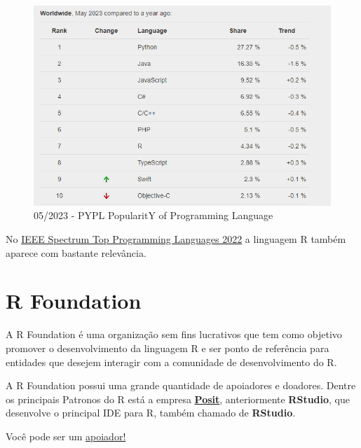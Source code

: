 \documentclass[
  letterpaper,
  DIV=11,
  numbers=noendperiod]{scrreprt}
\begin{document}
\begin{figure}

{\centering \includegraphics[width=1\textwidth,height=\textheight]{./images/r/pypl.PNG}

}

\caption{05/2023 - PYPL PopularitY of Programming Language}

\end{figure}

No \href{https://spectrum.ieee.org/top-programming-languages-2022}{IEEE
Spectrum Top Programming Languages 2022} a linguagem R também aparece
com bastante relevância.

\hypertarget{r-foundation}{%
\section*{R Foundation}\label{r-foundation}}


A R Foundation é uma organização sem fins lucrativos que tem como
objetivo promover o desenvolvimento da linguagem R e ser ponto de
referência para entidades que desejem interagir com a comunidade de
desenvolvimento do R.

A R Foundation possui uma grande quantidade de apoiadores e doadores.
Dentre os principais Patronos do R está a empresa
\href{https://posit.co/}{\textbf{Posit}}, anteriormente
\textbf{RStudio}, que desenvolve o principal IDE para R, também chamado
de \textbf{RStudio}.

Você pode ser um
\href{https://www.r-project.org/foundation/donations.html}{apoiador!}
\end{document}
